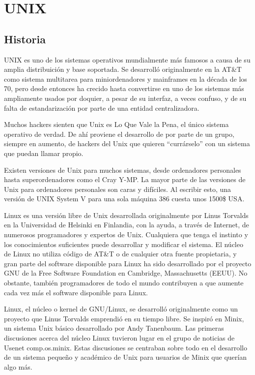 \chapter{UNIX}
\thispagestyle{empty}
\section{Historia}
UNIX es uno de los sistemas operativos mundialmente más famosos a
causa de su amplia distribuición y base soportada. Se desarrolló
originalmente en la AT\&T como sistema multitarea para miniordenadores
y mainframes en la década de los 70, pero desde entonces ha crecido
hasta convertirse en uno de los sistemas más ampliamente usados por
doquier, a pesar de su interfaz, a veces confuso, y de su falta de
estandarización por parte de una entidad centralizadora.

Muchos hackers sienten que Unix es Lo Que Vale la Pena, el único
sistema operativo de verdad. De ahí{} proviene el desarrollo de por
parte de un grupo, siempre en aumento, de hackers del Unix que quieren
``currárselo'' con un sistema que puedan llamar propio.

Existen versiones de Unix para muchos sistemas, desde ordenadores
personales hasta superordenadores como el Cray Y-MP. La mayor parte de
las versiones de Unix para ordenadores personales son caras y
difíciles. Al escribir esto, una versión de UNIX System V para una
sola máquina 386 cuesta unos 1500\$ USA.

Linux es una versión libre de Unix desarrollada originalmente por
Linus Torvalds en la Universidad de Helsinki en Finlandia, con la
ayuda, a través de Internet, de numerosos programadores y expertos de
Unix. Cualquiera que tenga el instinto y los conocimientos suficientes
puede desarrollar y modificar el sistema. El núcleo de Linux no utiliza
código de AT\&T o de cualquier otra fuente propietaria, y gran parte
del software disponible para Linux ha sido desarrollado por el proyecto GNU
de la Free Software Foundation en Cambridge, Massachusetts (EEUU). No
obstante, también programadores de todo el mundo contribuyen a que
aumente cada vez más el software disponible para Linux.

Linux, el núcleo o kernel de GNU/Linux, se desarrolló originalmente
como un proyecto que Linus Torvalds emprendió en su tiempo libre. Se
inspiró en Minix, un sistema Unix básico desarrollado por Andy
Tanenbaum. Las primeras discusiones acerca del núcleo Linux tuvieron
lugar en el grupo de noticias de Usenet comp.os.minix. Estas
discusiones se centraban sobre todo en el desarrollo de un sistema
pequeño y académico de Unix para usuarios de Minix que querían algo
más.

